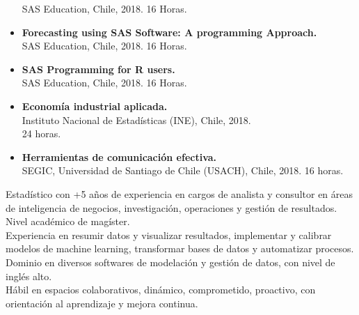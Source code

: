 \documentclass[10pt, a4paper, ragged2e, withhyper, spanish]{altacv}
\begin{document}
\begin{paracol}{2}
\begin{itemize}
	SAS Education, Chile, 2018. 16 Horas.
	\item \textbf{Forecasting using SAS Software: A programming Approach.} \\
	SAS Education, Chile, 2018. 16 Horas.
	\item \textbf{SAS Programming for R users.} \\
	SAS Education, Chile, 2018. 16 Horas.
	\item \textbf{Econom\'ia industrial aplicada.} \\
	Instituto Nacional de Estad\'isticas (INE), Chile, 2018.\\ 24 horas.
	\item \textbf{Herramientas de comunicaci\'on efectiva.} \\
	SEGIC, Universidad de Santiago de Chile (USACH), Chile, 2018. 16 horas.
\end{itemize}


\switchcolumn

{\justify Estadístico con +5 años de experiencia en cargos de analista y consultor en 
áreas de inteligencia de negocios, investigación, operaciones y gestión de resultados. Nivel académico de magíster.}\\

{\justify Experiencia en resumir datos y visualizar resultados, implementar y calibrar
 modelos de machine learning, transformar bases de datos y automatizar procesos.
 Dominio en diversos softwares de modelación y gestión de datos, con nivel de inglés alto.}\\

{\justify Hábil en espacios colaborativos, dinámico, comprometido, proactivo, con orientación al aprendizaje y mejora continua.}\\

\bigskip
\medskip

\medskip
{}
\medskip
{}
\medskip
{}


\end{paracol}
\end{document}
